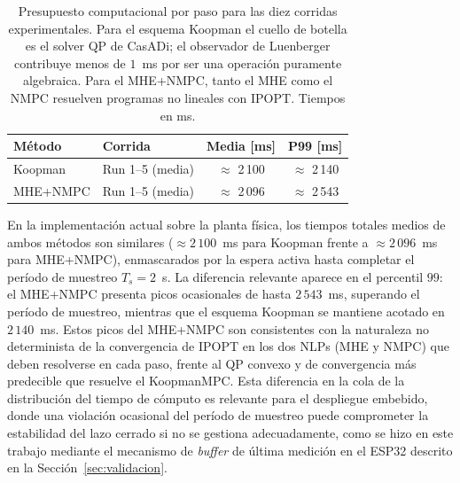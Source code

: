 \documentclass[12pt,letterpaper]{article}
\begin{document}
\begin{table}[H]
\centering
\caption{Presupuesto computacional por paso para las diez 
corridas experimentales. Para el esquema Koopman el cuello 
de botella es el solver QP de CasADi; el observador de 
Luenberger contribuye menos de $1$~ms por ser una operación 
puramente algebraica. Para el MHE+NMPC, tanto el MHE como 
el NMPC resuelven programas no lineales con IPOPT. 
Tiempos en ms.}
\label{tab:timing_exp}
\begin{tabular}{llcc}
\toprule
\textbf{Método} & \textbf{Corrida} & 
\textbf{Media [ms]} & \textbf{P99 [ms]} \\
\midrule
Koopman
  & Run 1--5 (media) & $\approx$ 2\,100 & $\approx$ 2\,140 \\
\midrule
MHE+NMPC
  & Run 1--5 (media) & $\approx$ 2\,096 & $\approx$ 2\,543 \\
\bottomrule
\end{tabular}
\end{table}

En la implementación actual sobre la planta física, los 
tiempos totales medios de ambos métodos son similares 
($\approx 2\,100$~ms para Koopman frente a $\approx 2\,096$~ms 
para MHE+NMPC), enmascarados por la espera activa hasta 
completar el período de muestreo $T_s = 2$~s. La diferencia 
relevante aparece en el percentil $99$: el MHE+NMPC presenta 
picos ocasionales de hasta $2\,543$~ms, superando el período 
de muestreo, mientras que el esquema Koopman se mantiene 
acotado en $2\,140$~ms. Estos picos del MHE+NMPC son 
consistentes con la naturaleza no determinista de la 
convergencia de IPOPT en los dos NLPs (MHE y NMPC) que deben 
resolverse en cada paso, frente al QP convexo y de 
convergencia más predecible que resuelve el KoopmanMPC. Esta 
diferencia en la cola de la distribución del tiempo de 
cómputo es relevante para el despliegue embebido, donde una 
violación ocasional del período de muestreo puede 
comprometer la estabilidad del lazo cerrado si no se gestiona 
adecuadamente, como se hizo en este trabajo mediante el 
mecanismo de \textit{buffer} de última medición en el ESP32 
descrito en la Sección~\ref{sec:validacion}.
\end{document}
